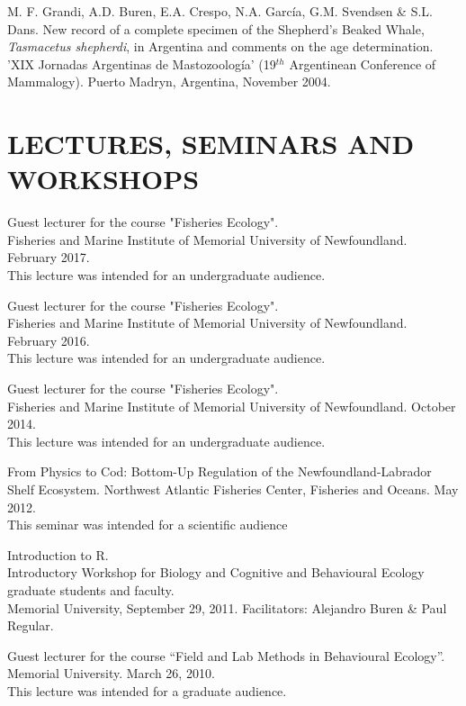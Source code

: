 \documentclass{res}
\begin{document}
\begin{resume}
\begin{hangparas}{.4in}{1}
M. F. Grandi, A.D. Buren, E.A. Crespo, N.A. García, G.M. Svendsen \& S.L. Dans. New record of a complete specimen of the Shepherd’s Beaked Whale, \textit{Tasmacetus shepherdi}, in Argentina and comments on the age determination. 'XIX Jornadas Argentinas de Mastozoolog\'{i}a' (19$^{th}$ Argentinean Conference of Mammalogy). Puerto Madryn, Argentina, November 2004.
	
	
\end{hangparas}	

\section{LECTURES, SEMINARS AND WORKSHOPS}
\vspace{0.1in} 


Guest lecturer for the course "Fisheries Ecology".\\ Fisheries and Marine Institute of Memorial University of Newfoundland. February 2017. \\
This lecture was intended for an undergraduate audience.

Guest lecturer for the course "Fisheries Ecology". \\Fisheries and Marine Institute of Memorial University of Newfoundland. February 2016. \\
This lecture was intended for an undergraduate audience.

Guest lecturer for the course "Fisheries Ecology". \\Fisheries and Marine Institute of Memorial University of Newfoundland. October 2014. \\
This lecture was intended for an undergraduate audience.

From Physics to Cod: Bottom-Up Regulation of the Newfoundland-Labrador Shelf Ecosystem. Northwest Atlantic Fisheries Center, Fisheries and Oceans. May 2012. \\
This seminar was intended for a scientific audience 

Introduction to R.\\ Introductory Workshop for Biology and Cognitive and Behavioural Ecology graduate students and faculty.\\ Memorial University, September 29, 2011. Facilitators: Alejandro Buren \& Paul Regular.

Guest lecturer for the course “Field and Lab Methods in Behavioural Ecology”.\\ Memorial University. March 26, 2010. \\
This lecture was intended for a graduate audience.


\end{resume}
\end{document}
